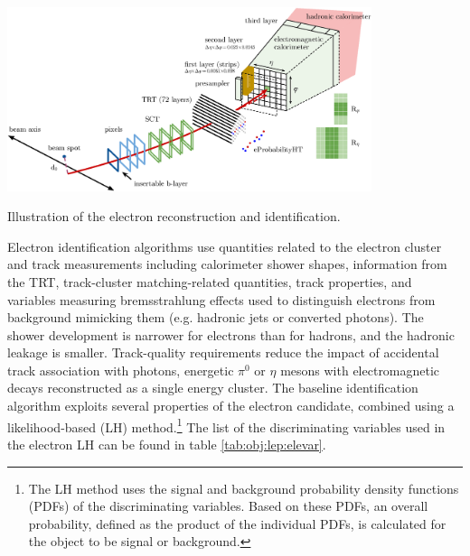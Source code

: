 \bfig[t!]
\centering
\includegraphics[width=0.8\textwidth]{figures/Objects/eleillustration.png}
\captionsetup{width=0.85\textwidth}  \caption{\small Illustration of the electron reconstruction and identification.}
\label{sec:obj:fig:elerec}
\efig


Electron identification algorithms \cite{ATLAS-CONF-2016-024} use quantities related to the electron cluster and track measurements including calorimeter shower shapes, information from the TRT, track-cluster matching-related quantities, track properties, and variables measuring bremsstrahlung effects used to distinguish electrons from background mimicking them (e.g. hadronic jets or converted photons). The shower development is narrower for electrons than for hadrons, and the hadronic leakage is smaller. Track-quality requirements reduce the impact of accidental track association with photons, energetic $\pi^{0}$ or $\eta$ mesons with electromagnetic decays reconstructed as a single energy cluster. The baseline identification algorithm exploits several properties of the electron candidate, combined using a likelihood-based (LH) method.\footnote{The LH method uses the signal and background probability density functions (PDFs) of the discriminating variables. Based on these PDFs, an overall probability, defined as the product of the individual PDFs, is calculated for the object to be signal or background.} The list of the discriminating variables used in the electron LH can be found in table \ref{tab:obj:lep:elevar}.
